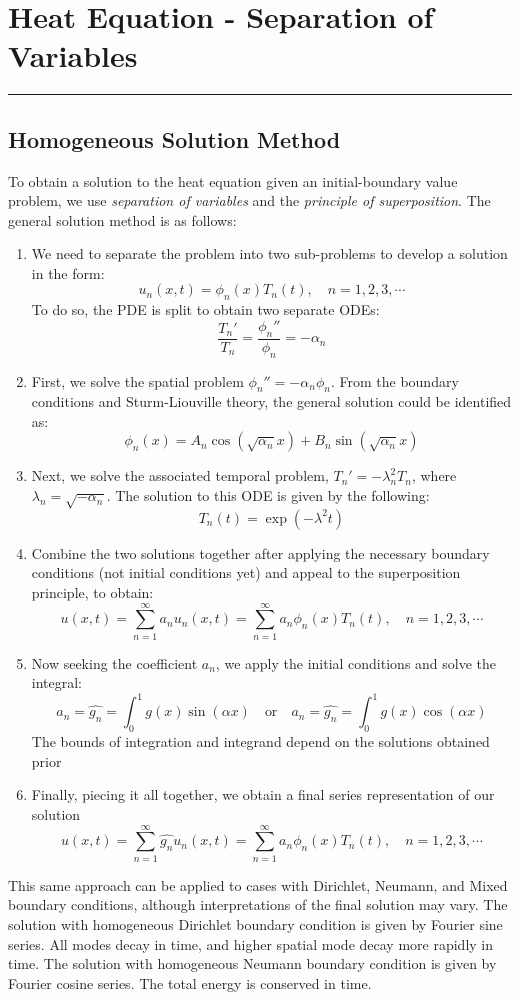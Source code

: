 \documentclass[11pt]{article}
\begin{document}
\pagebreak


\section{Heat Equation - Separation of Variables}
\hrule \vspace{15pt}

\subsection{Homogeneous Solution Method}
To obtain a solution to the heat equation given an initial-boundary value problem, we use \textit{separation of variables }and the \textit{principle of superposition}. The general solution method is as follows: 
\begin{enumerate}
\item We need to separate the problem into two sub-problems to develop a solution in the form: 
$$ u_n(x,t) = \phi_n(x) T_n(t), \quad n=1,2,3, \cdots$$
To do so, the PDE is split to obtain two separate ODEs:
$$ \frac{T_n'}{T_n} = \frac{\phi_n''}{\phi_n} = -\alpha_n$$
\item First, we solve the spatial problem $\phi_n'' = -\alpha_n \phi_n$.  From the boundary conditions and Sturm-Liouville theory, the general solution could be identified as:
$$ \phi_n(x) = A_n \cos ( \sqrt{\alpha_n} x) + B_n \sin ( \sqrt{\alpha_n} x)$$
\item Next, we solve the associated temporal problem, $T_n' = -\lambda_n^2 T_n$, where $\lambda_n = \sqrt{-\alpha_n}$. The solution to this ODE is given by the following: 
$$ T_n(t) = \exp(-\lambda^2 t)$$
\item Combine the two solutions together after applying the necessary boundary conditions (not initial conditions yet) and appeal to the superposition principle, to obtain:
$$u(x,t) =  \sum_{n=1}^{\infty} a_n u_n(x,t) =  \sum_{n=1}^{\infty} a_n \phi_n(x) T_n(t), \quad n=1,2,3, \cdots$$
\item Now seeking the coefficient $a_n$, we apply the initial conditions and solve the integral:
$$ a_n = \hat{g_n} = \int_0^1 g(x) \sin(\alpha x)\quad \text{or} \quad a_n = \hat{g_n} = \int_0^1 g(x) \cos(\alpha x)  $$
The bounds of integration and integrand depend on the solutions obtained prior
\item Finally, piecing it all together, we obtain a final series representation of our solution
$$u(x,t) =  \sum_{n=1}^{\infty} \hat{g_n} u_n(x,t) =  \sum_{n=1}^{\infty} a_n \phi_n(x) T_n(t), \quad n=1,2,3, \cdots$$
\end{enumerate}
This same approach can be applied to cases with Dirichlet, Neumann, and Mixed boundary conditions, although interpretations of the final solution may vary. The solution with homogeneous Dirichlet boundary condition is given by Fourier sine series.  All modes decay in time,  and higher spatial mode decay more rapidly in time. The solution with homogeneous Neumann boundary condition is given by Fourier cosine series. The total energy is conserved in time.
\pagebreak
\end{document}
